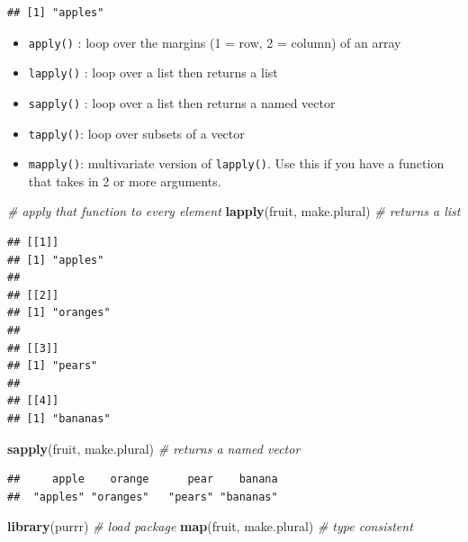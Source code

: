 \documentclass[
]{book}
\newenvironment{Shaded}{\begin{snugshade}}{\end{snugshade}}
\newcommand{\CommentTok}[1]{\textcolor[rgb]{0.56,0.35,0.01}{\textit{#1}}}
\newcommand{\FunctionTok}[1]{\textcolor[rgb]{0.13,0.29,0.53}{\textbf{#1}}}
\newcommand{\NormalTok}[1]{#1}
\providecommand{\tightlist}{%
  \setlength{\itemsep}{0pt}\setlength{\parskip}{0pt}}
\begin{document}
\begin{verbatim}
## [1] "apples"
\end{verbatim}

\begin{itemize}
\tightlist
\item
  \texttt{apply()} : loop over the margins (1 = row, 2 = column) of an array
\item
  \texttt{lapply()} : loop over a list then returns a list
\item
  \texttt{sapply()} : loop over a list then returns a named vector
\item
  \texttt{tapply()}: loop over subsets of a vector
\item
  \texttt{mapply()}: multivariate version of \texttt{lapply()}. Use this if you have a function that takes in 2 or more arguments.
\end{itemize}

\begin{Shaded}
\begin{Highlighting}[]
\CommentTok{\# apply that function to every element}
\FunctionTok{lapply}\NormalTok{(fruit, make.plural) }\CommentTok{\# returns a list}
\end{Highlighting}
\end{Shaded}

\begin{verbatim}
## [[1]]
## [1] "apples"
## 
## [[2]]
## [1] "oranges"
## 
## [[3]]
## [1] "pears"
## 
## [[4]]
## [1] "bananas"
\end{verbatim}

\begin{Shaded}
\begin{Highlighting}[]
\FunctionTok{sapply}\NormalTok{(fruit, make.plural) }\CommentTok{\# returns a named vector}
\end{Highlighting}
\end{Shaded}

\begin{verbatim}
##     apple    orange      pear    banana 
##  "apples" "oranges"   "pears" "bananas"
\end{verbatim}

\begin{Shaded}
\begin{Highlighting}[]
\FunctionTok{library}\NormalTok{(purrr) }\CommentTok{\# load package}
\FunctionTok{map}\NormalTok{(fruit, make.plural) }\CommentTok{\# type consistent}
\end{Highlighting}
\end{Shaded}
\end{document}
